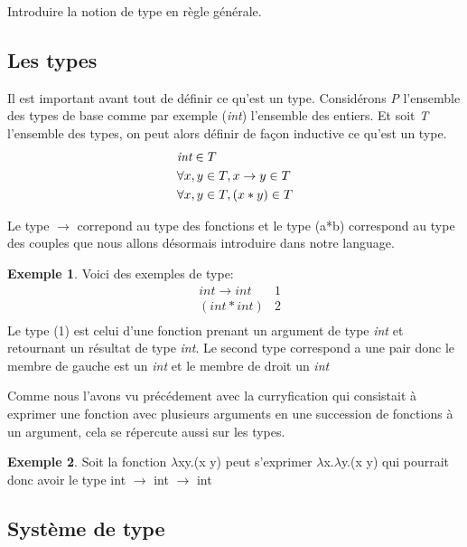 \documentclass {article}
\theoremstyle{definition}
\newtheorem{example}{Exemple}
\theoremstyle{remark}
\begin{document}
Introduire la notion de type en règle générale.

\subsection{Les types}

Il est important avant tout de définir ce qu'est un type.
Considérons \emph{P} l'ensemble des types de base comme par exemple 
(\emph{int}) l'ensemble des entiers.
Et soit \emph{T} l'ensemble des types, on peut alors définir de façon inductive
ce qu'est un type.
\begin{align*}
  &\emph{int} \in T \\
  &\forall x,y \in T, x \rightarrow y \in T \\
  &\forall x,y \in T, (x * y) \in T   
\end{align*}

Le type \(\rightarrow\) correpond au type des fonctions et le type (a*b)
correspond au type des couples que nous allons désormais introduire dans notre language.

\begin{example}
  Voici des exemples de type:
  \begin{align*}
  & int \rightarrow int & \mbox{1} \\
  & (int * int) &\mbox{2} \\
  \end{align*}
  Le type (1) est celui d'une fonction prenant un argument de type \emph{int} et 
  retournant un résultat de type \emph{int}.
  Le second type correspond a une pair donc le membre de gauche est un \emph{int}
  et le membre de droit un \emph{int}
\end{example}

Comme nous l'avons vu précédement avec la curryfication qui consistait à exprimer une 
fonction avec plusieurs arguments en une succession de fonctions à un argument, cela 
se répercute aussi sur les types.

\begin{example}
  Soit la fonction \(\lambda\)x\:y.(x y) peut s'exprimer 
  \(\lambda\)x.\(\lambda\)y.(x y) qui pourrait donc avoir 
  le type int \(\rightarrow\) int \(\rightarrow\) int  
\end{example}

\subsection{Système de type}
\end{document}
